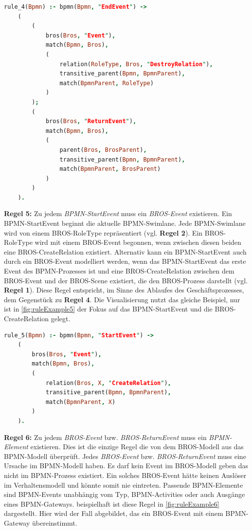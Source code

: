 \begin{lstlisting}[language=Prolog, caption=Formalisierung der Regel 4, label=lst:rule_4]
rule_4(Bpmn) :- bpmn(Bpmn, "EndEvent") ->
    (
        (
            bros(Bros, "Event"),
            match(Bpmn, Bros),
            (
                relation(RoleType, Bros, "DestroyRelation"),
                transitive_parent(Bpmn, BpmnParent),
                match(BpmnParent, RoleType)
            )
        );
        (
            bros(Bros, "ReturnEvent"), 
            match(Bpmn, Bros),
            (
                parent(Bros, BrosParent),
                transitive_parent(Bpmn, BpmnParent),
                match(BpmnParent, BrosParent)
            )
        )
    ).
\end{lstlisting}

\textbf{Regel 5:}
Zu jedem \emph{BPMN-StartEvent} muss ein \emph{BROS-Event} existieren.
Ein BPMN-StartEvent beginnt die aktuelle BPMN-Swimlane.
Jede BPMN-Swimlane wird von einem BROS-RoleType repräsentiert (vgl. \textbf{Regel 2}).
Ein BROS-RoleType wird mit einem BROS-Event begonnen, wenn  zwischen diesen beiden eine BROS-CreateRelation existiert.
Alternativ kann ein BPMN-StartEvent auch durch ein BROS-Event modelliert werden, wenn das BPMN-StartEvent das erste Event des BPMN-Prozesses ist und eine BROS-CreateRelation zwischen dem BROS-Event und der BROS-Scene existiert, die den BROS-Prozess darstellt (vgl. \textbf{Regel 1}).
Diese Regel entspricht, im Sinne des Ablaufes des Geschäftsprozesses, dem Gegenstück zu \textbf{Regel 4}.
Die Visualisierung nutzt das gleiche Beispiel, nur ist in \cref{fig:ruleExample5} der Fokus auf das BPMN-StartEvent und die BROS-CreateRelation gelegt.

\begin{lstlisting}[language=Prolog, caption=Formalisierung der Regel 5, label=lst:rule_5]
rule_5(Bpmn) :- bpmn(Bpmn, "StartEvent") ->
    (
        bros(Bros, "Event"),
        match(Bpmn, Bros),
        (
            relation(Bros, X, "CreateRelation"),
            transitive_parent(Bpmn, BpmnParent),
            match(BpmnParent, X)
        )
    ).
\end{lstlisting}

\textbf{Regel 6:}
Zu jedem \emph{BROS-Event} bzw. \emph{BROS-ReturnEvent} muss ein \emph{BPMN-Element} existieren.
Dies ist die einzige Regel die von dem BROS-Modell aus das BPMN-Modell überprüft.
Jedes \emph{BROS-Event} bzw. \emph{BROS-ReturnEvent} muss eine Ursache im BPMN-Modell haben.
Es darf kein Event im BROS-Modell geben das nicht im BPMN-Prozess existiert.
Ein solches BROS-Event hätte keinen Auslöser im Verhaltensmodell und könnte somit nie eintreten.
Passende BPMN-Elemente sind BPMN-Events unabhängig vom Typ, BPMN-Activities oder auch Ausgänge eines BPMN-Gateways.
beispielhaft ist diese Regel in \cref{fig:ruleExample6} dargestellt.
Hier wird der Fall abgebildet, das ein BROS-Event mit einem BPMN-Gateway übereinstimmt.

